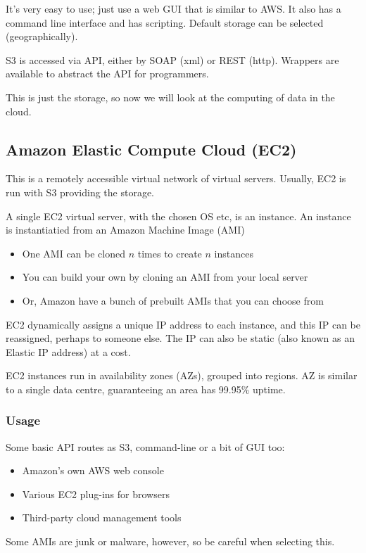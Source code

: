 \documentclass[11pt,a4paper,titlepage,dvipsnames,cmyk]{scrartcl}
\begin{document}
It's very easy to use; just use a web GUI that is similar to AWS. It also has a command line interface and has scripting. Default storage can be selected (geographically).

S3 is accessed via API, either by SOAP (xml) or REST (http). Wrappers are available to abstract the API for programmers.

This is just the storage, so now we will look at the computing of data in the cloud.

\subsection{Amazon Elastic Compute Cloud (EC2)}
This is a remotely accessible virtual network of virtual servers. Usually, EC2 is run with S3 providing the storage.

A single EC2 virtual server, with the chosen OS etc, is an instance. An instance is instantiatied from an Amazon Machine Image (AMI)
\begin{itemize}
    \item One AMI can be cloned $n$ times to create $n$ instances
    \item You can build your own by cloning an AMI from your local server
    \item Or, Amazon have a bunch of prebuilt AMIs that you can choose from
\end{itemize}

EC2 dynamically assigns a unique IP address to each instance, and this IP can be reassigned, perhaps to someone else. The IP can also be static (also known as an Elastic IP address) at a cost.

EC2 instances run in availability zones (AZs), grouped into regions. AZ is similar to a single data centre, guaranteeing an area has 99.95\% uptime.

\subsubsection{Usage}
Some basic API routes as S3, command-line or a bit of GUI too:
\begin{itemize}
    \item Amazon's own AWS web console
    \item Various EC2 plug-ins for browsers
    \item Third-party cloud management tools
\end{itemize}

Some AMIs are junk or malware, however, so be careful when selecting this.
\end{document}
